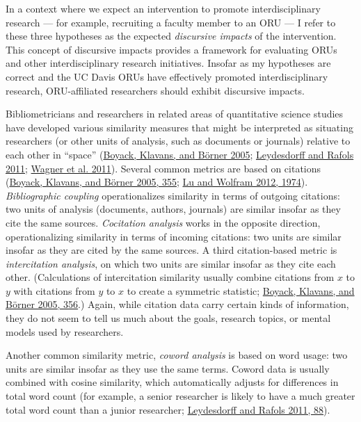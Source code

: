 \documentclass[
  11pt,
]{article}
\begin{document}
In a context where we expect an intervention to promote interdisciplinary research --- for example, recruiting a faculty member to an ORU --- I refer to these three hypotheses as the expected \emph{discursive impacts} of the intervention. This concept of discursive impacts provides a framework for evaluating ORUs and other interdisciplinary research initiatives. Insofar as my hypotheses are correct and the UC Davis ORUs have effectively promoted interdisciplinary research, ORU-affiliated researchers should exhibit discursive impacts.

Bibliometricians and researchers in related areas of quantitative science studies have developed various similarity measures that might be interpreted as situating researchers (or other units of analysis, such as documents or journals) relative to each other in ``space'' (\protect\hyperlink{ref-BoyackMappingBackboneScience2005}{Boyack, Klavans, and Börner 2005}; \protect\hyperlink{ref-LeydesdorffIndicatorsInterdisciplinarityJournals2011}{Leydesdorff and Rafols 2011}; \protect\hyperlink{ref-WagnerApproachesUnderstandingMeasuring2011}{Wagner et al. 2011}). Several common metrics are based on citations (\protect\hyperlink{ref-BoyackMappingBackboneScience2005}{Boyack, Klavans, and Börner 2005, 355}; \protect\hyperlink{ref-LuMeasuringAuthorResearch2012}{Lu and Wolfram 2012, 1974}). \emph{Bibliographic coupling} operationalizes similarity in terms of outgoing citations: two units of analysis (documents, authors, journals) are similar insofar as they cite the same sources. \emph{Cocitation analysis} works in the opposite direction, operationalizing similarity in terms of incoming citations: two units are similar insofar as they are cited by the same sources. A third citation-based metric is \emph{intercitation analysis}, on which two units are similar insofar as they cite each other. (Calculations of intercitation similarity usually combine citations from \(x\) to \(y\) with citations from \(y\) to \(x\) to create a symmetric statistic; \protect\hyperlink{ref-BoyackMappingBackboneScience2005}{Boyack, Klavans, and Börner 2005, 356}.) Again, while citation data carry certain kinds of information, they do not seem to tell us much about the goals, research topics, or mental models used by researchers.

Another common similarity metric, \emph{coword analysis} is based on word usage: two units are similar insofar as they use the same terms. Coword data is usually combined with cosine similarity, which automatically adjusts for differences in total word count (for example, a senior researcher is likely to have a much greater total word count than a junior researcher; \protect\hyperlink{ref-LeydesdorffIndicatorsInterdisciplinarityJournals2011}{Leydesdorff and Rafols 2011, 88}).
\end{document}
